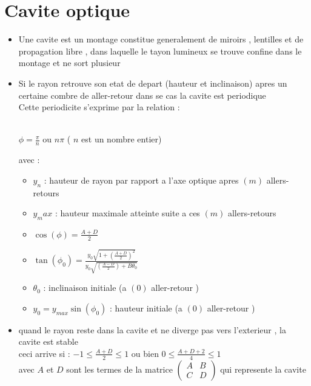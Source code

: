 \documentclass[12pt]{book}
\begin{document}
    \section{Cavite optique}
        \begin{itemize}
            \item Une cavite est un montage constitue generalement de miroirs , lentilles et de propagation libre , dans laquelle le tayon lumineux se trouve confine dans le montage et ne sort plusieur
            \item Si le rayon retrouve son etat de depart (hauteur et inclinaison) apres un certaine combre de aller-retour dans se cas la cavite est periodique \\
                  Cette periodicite s'exprime par la relation :
                  \begin{center}
                     \\
                    $\phi = \frac{\pi}{n}$ ou $n\pi$ ( $n$ est un nombre entier)
                  \end{center}
                  avec : 
                  \begin{itemize}
                    \item $y_n$ : hauteur de rayon par rapport a l'axe optique apres $(m)$ allers-retours
                    \item $y_max$ : hauteur maximale atteinte suite a ces $(m)$ allers-retours 
                    \item $\cos(\phi) = \frac{A+D}{2}$
                    \item $\tan(\phi_0) = \frac{y_0\sqrt{1+(\frac{A+D}{2})^2}}{y_0 \sqrt{(\frac{A-D}{2})+B\theta_0}}$
                    \item $\theta_0 $ : inclinaison initiale (a $(0)$ aller-retour ) 
                    \item $y_0 = y_{max}\sin(\phi_0) $ : hauteur initiale (a $(0)$ aller-retour ) 
                  \end{itemize}
            \item quand le rayon reste dans la cavite et ne diverge pas vers l'exterieur , la cavite est stable
             \\   ceci arrive si : $-1 \leq \frac{A+D}{2}\leq 1 $ ou bien $0 \leq \frac{A+D+2}{4}\leq 1 $ \\
             avec $A$ et $D$ sont les termes de la matrice 
             $\begin{pmatrix}
                A & B\\
                C & D
            \end{pmatrix}$
            qui represente la cavite 
        \end{itemize}
        \pagebreak
\end{document}
